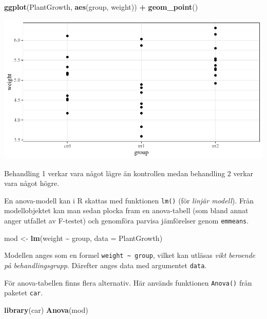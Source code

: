 \documentclass[
]{book}
\newenvironment{Shaded}{\begin{snugshade}}{\end{snugshade}}
\newcommand{\AttributeTok}[1]{\textcolor[rgb]{0.13,0.29,0.53}{#1}}
\newcommand{\FunctionTok}[1]{\textcolor[rgb]{0.13,0.29,0.53}{\textbf{#1}}}
\newcommand{\NormalTok}[1]{#1}
\newcommand{\OtherTok}[1]{\textcolor[rgb]{0.56,0.35,0.01}{#1}}
\newcommand{\SpecialCharTok}[1]{\textcolor[rgb]{0.81,0.36,0.00}{\textbf{#1}}}
\theoremstyle{definition}
\theoremstyle{definition}
\theoremstyle{definition}
\theoremstyle{definition}
\theoremstyle{remark}
\begin{document}
\begin{Shaded}
\begin{Highlighting}[]
\FunctionTok{ggplot}\NormalTok{(PlantGrowth, }\FunctionTok{aes}\NormalTok{(group, weight)) }\SpecialCharTok{+}
  \FunctionTok{geom\_point}\NormalTok{()}
\end{Highlighting}
\end{Shaded}

\begin{center}\includegraphics{R-anvisningar_files/figure-latex/unnamed-chunk-209-1} \end{center}

Behandling 1 verkar vara något lägre än kontrollen medan behandling 2 verkar vara något högre.

En anova-modell kan i R skattas med funktionen \texttt{lm()} (för \emph{linjär modell}). Från modellobjektet kan man sedan plocka fram en anova-tabell (som bland annat anger utfallet av F-testet) och genomföra parvisa jämförelser genom \texttt{emmeans}.

\begin{Shaded}
\begin{Highlighting}[]
\NormalTok{mod }\OtherTok{\textless{}{-}} \FunctionTok{lm}\NormalTok{(weight }\SpecialCharTok{\textasciitilde{}}\NormalTok{ group, }\AttributeTok{data =}\NormalTok{ PlantGrowth)}
\end{Highlighting}
\end{Shaded}

Modellen anges som en formel \texttt{weight\ \textasciitilde{}\ group}, vilket kan utläsas \emph{vikt beroende på behandlingsgrupp}. Därefter anges data med argumentet \texttt{data}.

För anova-tabellen finns flera alternativ. Här används funktionen \texttt{Anova()} från paketet \texttt{car}.

\begin{Shaded}
\begin{Highlighting}[]
\FunctionTok{library}\NormalTok{(car)}
\FunctionTok{Anova}\NormalTok{(mod)}
\end{Highlighting}
\end{Shaded}
\end{document}
